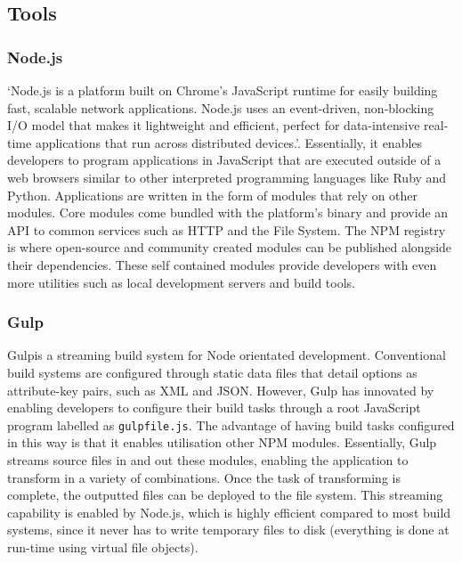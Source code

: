 \documentclass[final]{cmpreport}
\begin{document}

\subsection{Tools}

\subsubsection{Node.js}
`Node.js is a platform built on Chrome's JavaScript runtime for easily building fast, scalable network applications. Node.js uses an event-driven, non-blocking I/O model that makes it lightweight and efficient, perfect for data-intensive real-time applications that run across distributed devices.'\footnotemark[21]. Essentially, it enables developers to program applications in JavaScript that are executed outside of a web browsers similar to other interpreted programming languages like Ruby and Python. Applications are written in the form of modules that rely on other modules. Core modules come bundled with the platform's binary and provide an API to common services such as HTTP and the File System. The NPM registry is where open-source and community created modules can be published alongside their dependencies. These self contained modules provide developers with even more utilities such as local development servers and build tools.


\subsubsection{Gulp}
Gulp\footnotemark[22] is a streaming build system for Node orientated development. Conventional build systems are configured through static data files that detail options as attribute-key pairs, such as XML and JSON. However, Gulp has innovated by enabling developers to configure their build tasks through a root JavaScript program labelled as \texttt{gulpfile.js}. The advantage of having build tasks configured in this way is that it enables utilisation other NPM modules. Essentially, Gulp streams source files in and out these modules, enabling the application to transform in a variety of combinations. Once the task of transforming is complete, the outputted files can be deployed to the file system. This streaming capability is enabled by Node.js, which is highly efficient compared to most build systems, since it never has to write temporary files to disk (everything is done at run-time using virtual file objects).
\end{document}
